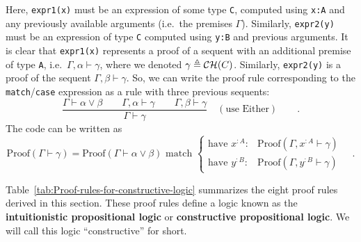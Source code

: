 \noindent Here, \lstinline!expr1(x)! must be an expression of some
type \lstinline!C!, computed using \lstinline!x:A! and any previously
available arguments (i.e.~the premises $\Gamma$). Similarly, \lstinline!expr2(y)!
must be an expression of type \lstinline!C! computed using \lstinline!y:B!
and previous arguments. It is clear that \lstinline!expr1(x)! represents
a proof of a sequent with an additional premise of type \lstinline!A!,
i.e.~$\Gamma,\alpha\vdash\gamma$, where we denoted $\gamma\triangleq{\cal CH}(C)$.
Similarly, \lstinline!expr2(y)! is a proof of the sequent $\Gamma,\beta\vdash\gamma$.
So, we can write the proof rule corresponding to the \lstinline!match!/\lstinline!case!
expression as a rule with three previous sequents:
\[
\frac{\Gamma\vdash\alpha\vee\beta\quad\quad\Gamma,\alpha\vdash\gamma\quad\quad\Gamma,\beta\vdash\gamma}{\Gamma\vdash\gamma}\quad(\text{use Either})\quad\quad.
\]
The code can be written as 
\[
\text{Proof}\left(\Gamma\vdash\gamma\right)=\text{Proof}\left(\Gamma\vdash\alpha\vee\beta\right)\text{ match }\begin{cases}
\text{have }x^{:A}: & \text{Proof}\left(\Gamma,x^{:A}\vdash\gamma\right)\\
\text{have }y^{:B}: & \text{Proof}(\Gamma,y^{:B}\vdash\gamma)
\end{cases}\quad.
\]

Table~\ref{tab:Proof-rules-for-constructive-logic} summarizes the
eight proof rules derived in this section. These proof rules define
a logic known as the \textbf{intuitionistic
propositional logic} or \textbf{constructive
propositional logic}. We will call this logic ``constructive'' for
short.


